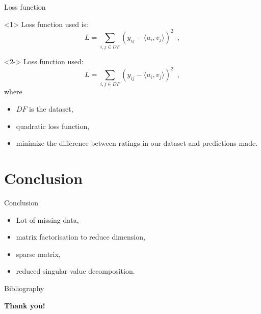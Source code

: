 \documentclass[unknownkeysallowed]{beamer}
\begin{document}
\begin{frame}{Loss function}
\begin{onlyenv}<1>
    Loss function used is:
    $$L=\sum_{i,j \in DF} (y_{ij} - \langle u_i,v_j\rangle  )^2 \enspace,$$
\end{onlyenv}
\begin{onlyenv}<2->
    Loss function used:
    $$L=\sum_{i,j \in DF} (y_{ij} - \langle u_i,v_j\rangle  )^2 \enspace, $$
    where 
    \begin{itemize}
        \item $DF$ is the dataset, 
        \item quadratic loss function,
        \item minimize the difference between ratings in our dataset and predictions made.
    \end{itemize}
\end{onlyenv}
\end{frame}

\section{Conclusion}

\begin{frame}{Conclusion}
\begin{itemize}
    \item Lot of missing data, 
    \item matrix factorisation to reduce dimension, 
    \item sparse matrix,
    \item reduced singular value decomposition.
\end{itemize}
\end{frame}

\begin{frame}{Bibliography}
\nocite{*}
\printbibliography
\end{frame}

\addtocounter{framenumber}{-1}
\begin{frame}[plain]{}
\begin{center}
    \LARGE\color{marron}
\textbf{Thank you!}
\end{center}
\end{frame}
\end{document}
